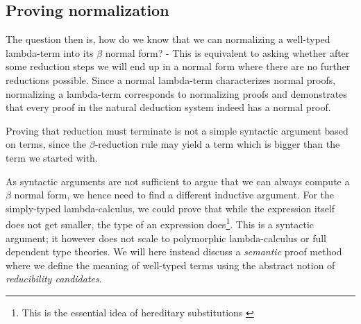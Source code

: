 \documentclass{article}
\newcommand{\nf}[2]{#1 : #2 ~\mathsf{nf}}
\newcommand{\neu}[2]{#1 : #2 ~\mathsf{ne}}
\begin{document}





\subsection*{Proving normalization}
The question then is, how do we know that we can normalizing a well-typed lambda-term into its $\beta$ normal form? - This is equivalent to asking whether after some reduction steps we will end up in a normal form where there are no further reductions possible. Since a normal lambda-term characterizes normal proofs, normalizing a lambda-term corresponds to normalizing proofs and demonstrates that every proof in the natural deduction system indeed has a normal proof. %

Proving that reduction must terminate is not a simple syntactic argument based on terms, since the $\beta$-reduction rule may yield a term which is bigger than the term we started with. %

As syntactic arguments are not sufficient to argue that we can always compute a $\beta$ normal form, we hence need to find a different inductive argument. For the simply-typed lambda-calculus, we could prove that while the expression itself does not get smaller,  the type of an expression does\footnote{This is the essential idea of hereditary substitutions \cite{Watkins02tr}}.  This is a syntactic argument; it however does not scale to polymorphic lambda-calculus or full dependent type theories. We will here instead discuss a \emph{semantic} proof method where we define the meaning of well-typed terms using the abstract notion of \emph{reducibility candidates}.
\end{document}
